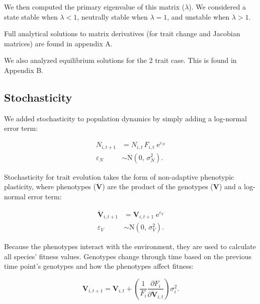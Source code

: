 \noindent We then computed the primary eigenvalue of this matrix ($\lambda$).
We considered a state stable when $\lambda < 1$,
neutrally stable when $\lambda = 1$,
and unstable when $\lambda > 1$.

Full analytical solutions to matrix derivatives (for trait change and
Jacobian matrices) are found in appendix A.

We also analyzed equilibrium solutions for the 2 trait case.
This is found in Appendix B.


\subsection*{Stochasticity}

We added stochasticity to population dynamics by simply adding 
a log-normal error term:

\begin{equation} \label{eq:N-stochasticity}
\begin{split}
    N_{i,t+1} &= N_{i,t} \, F_{i,t} \; \text{e}^{\varepsilon_N} \\
    \varepsilon_N &\sim \text{N}(0, \, \sigma^2_N)
    \text{.}
\end{split}
\end{equation}


Stochasticity for trait evolution takes the form of non-adaptive
phenotypic plasticity,
where phenotypes ($\mathbf{\ddot{V}}$) are the product of the
genotypes ($\mathbf{V}$) and a log-normal error term:

\begin{equation} \label{eq:V-stochasticity}
\begin{split}
    \mathbf{\ddot{V}}_{i,t+1} &= \mathbf{V}_{i,t+1} \; \text{e}^{\varepsilon_V} \\
    \varepsilon_V &\sim \text{N}(0, \, \sigma^2_V)
    \text{.}
\end{split}
\end{equation}

Because the phenotypes interact with the environment, they are used
to calculate all species' fitness values.
Genotypes change through time based on the previous time point's 
genotypes and how the phenotypes affect fitness:

\begin{equation} \label{eq:trait-change-stochastic}
    \mathbf{V}_{i,t+1} = \mathbf{V}_{i,t} + \left( \frac{1}{F_i}
        \frac{\partial F_i}{\partial \mathbf{\ddot{V}}_{i,t}} \right) \sigma^2_i
    \textrm{.}
\end{equation}





